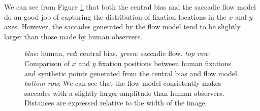 We can see from Figure \ref{fig:flowHumanComp} that both the central bias and the saccadic flow model do an good job of capturing the distribution of fixation locations in the $x$ and $y$ axes. However, the saccades generated by the flow model tend to be slightly larger than those made by human observers. 

\begin{figure}[htb]
\centering
{}
\caption{\textit{blue}: human, \textit{red}: central bias, \textit{green}: saccadic flow. \textit{top row}: Comparison of $x$ and $y$ fixation positions between human fixations and synthetic points generated from the central bias and flow model. \textit{bottom row}: We can see that the flow model consistently makes saccades with a slightly larger amplitude than human observers. Distances are expressed relative to the width of the image.}
\label{fig:flowHumanComp}
\end{figure}

